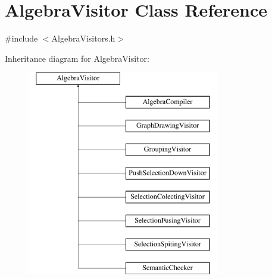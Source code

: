 \hypertarget{class_algebra_visitor}{\section{Algebra\+Visitor Class Reference}
\label{class_algebra_visitor}
}


{\ttfamily \#include $<$Algebra\+Visitors.\+h$>$}

Inheritance diagram for Algebra\+Visitor\+:\begin{figure}[H]
\begin{center}
\leavevmode
\includegraphics[height=9.000000cm]{class_algebra_visitor}
\end{center}
\end{figure}
